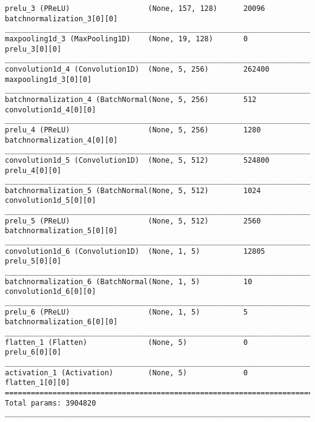 \begin{lstlisting}[basicstyle=\tiny,frame=single]
prelu_3 (PReLU)                  (None, 157, 128)      20096       batchnormalization_3[0][0]         
____________________________________________________________________________________________________
maxpooling1d_3 (MaxPooling1D)    (None, 19, 128)       0           prelu_3[0][0]
____________________________________________________________________________________________________
convolution1d_4 (Convolution1D)  (None, 5, 256)        262400      maxpooling1d_3[0][0]
____________________________________________________________________________________________________
batchnormalization_4 (BatchNormal(None, 5, 256)        512         convolution1d_4[0][0]
____________________________________________________________________________________________________
prelu_4 (PReLU)                  (None, 5, 256)        1280        batchnormalization_4[0][0]
____________________________________________________________________________________________________
convolution1d_5 (Convolution1D)  (None, 5, 512)        524800      prelu_4[0][0]
____________________________________________________________________________________________________
batchnormalization_5 (BatchNormal(None, 5, 512)        1024        convolution1d_5[0][0]
____________________________________________________________________________________________________
prelu_5 (PReLU)                  (None, 5, 512)        2560        batchnormalization_5[0][0]
____________________________________________________________________________________________________
convolution1d_6 (Convolution1D)  (None, 1, 5)          12805       prelu_5[0][0]
____________________________________________________________________________________________________
batchnormalization_6 (BatchNormal(None, 1, 5)          10          convolution1d_6[0][0]
____________________________________________________________________________________________________
prelu_6 (PReLU)                  (None, 1, 5)          5           batchnormalization_6[0][0]
____________________________________________________________________________________________________
flatten_1 (Flatten)              (None, 5)             0           prelu_6[0][0]
____________________________________________________________________________________________________
activation_1 (Activation)        (None, 5)             0           flatten_1[0][0]
====================================================================================================
Total params: 3904820
____________________________________________________________________________________________________
\end{lstlisting}

